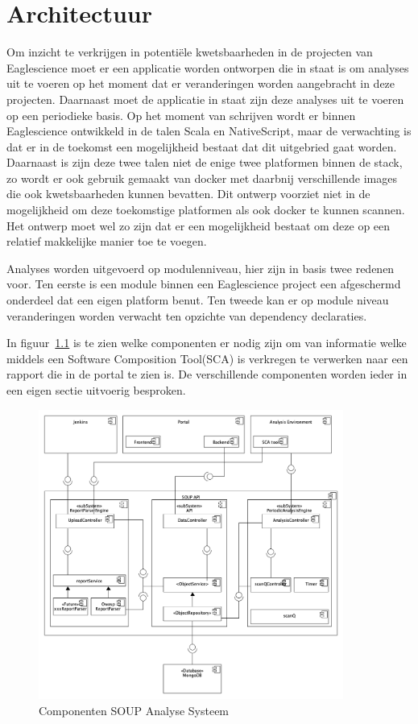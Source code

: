 \chapter{Architectuur}\label{ch:Architectuur}

Om inzicht te verkrijgen in potentiële kwetsbaarheden in de projecten van Eaglescience moet er een applicatie worden ontworpen die in staat is om analyses uit te voeren op het moment dat er veranderingen worden aangebracht in deze projecten. Daarnaast moet de applicatie in staat zijn deze analyses uit te voeren op een periodieke basis.
Op het moment van schrijven wordt er binnen Eaglescience ontwikkeld in de talen Scala en NativeScript, maar de verwachting is dat er in de toekomst een mogelijkheid bestaat dat dit uitgebried gaat worden. Daarnaast is zijn deze twee talen niet de enige twee platformen binnen de stack, zo wordt er ook gebruik gemaakt van docker met daarbnij verschillende images die ook kwetsbaarheden kunnen bevatten. Dit ontwerp voorziet niet in de mogelijkheid om deze toekomstige platformen als ook docker te kunnen scannen. Het ontwerp moet wel zo zijn dat er een mogelijkheid bestaat om deze op een relatief makkelijke manier toe te voegen.

Analyses worden uitgevoerd op modulenniveau, hier zijn in basis twee redenen voor. Ten eerste is een module binnen een Eaglescience project een afgeschermd onderdeel dat een eigen platform benut. Ten tweede kan er op module niveau veranderingen worden verwacht ten opzichte van dependency declaraties.

In figuur~\ref{fig:SOUP-Components} is te zien welke componenten er nodig zijn om van informatie welke middels een Software Composition Tool(SCA) is verkregen te verwerken naar een rapport die in de portal te zien is. De verschillende componenten worden ieder in een eigen sectie uitvoerig besproken.%
\begin{figure}[bth]
    \myfloatalign
    \includegraphics[width=10cm]{gfx/umlet/exports/ApplicationComponents}
    \caption{Componenten SOUP Analyse Systeem}
    \label{fig:SOUP-Components}
\end{figure}
